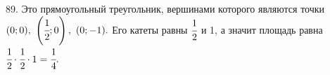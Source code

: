 89. Это прямоугольный треугольник, вершинами которого являются точки $(0;0),\ \left(\cfrac{1}{2};0\right),\ (0;-1).$ Его катеты равны $\cfrac{1}{2}$ и 1, а значит площадь равна $\cfrac{1}{2}\cdot\cfrac{1}{2}\cdot1=\cfrac{1}{4}.$\\
